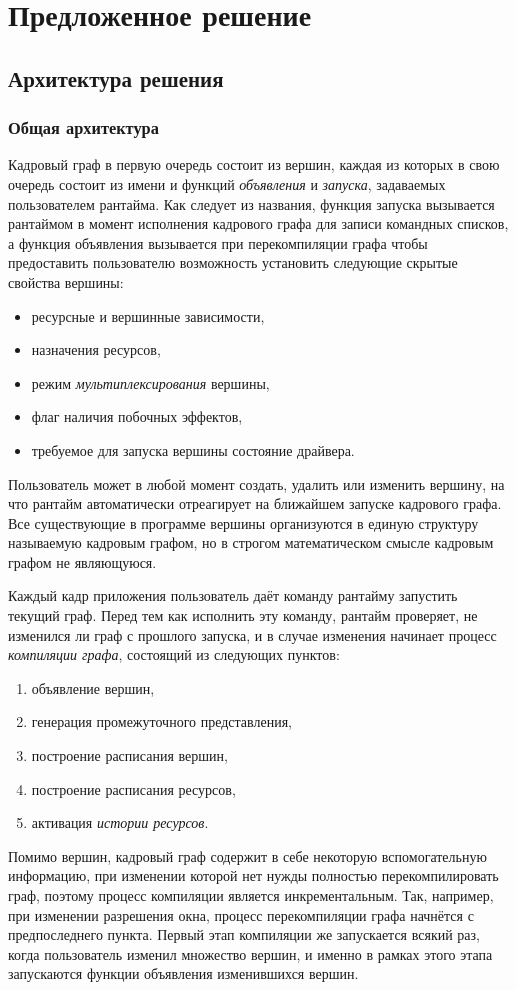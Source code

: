\section{Предложенное решение}
\subsection{Архитектура решения}
\subsubsection{Общая архитектура}
Кадровый граф в первую очередь состоит из вершин, каждая из которых в свою очередь состоит из имени и функций \textit{объявления} и \textit{запуска}, задаваемых пользователем рантайма.
Как следует из названия, функция запуска вызывается рантаймом в момент исполнения кадрового графа для записи командных списков, а функция объявления вызывается при перекомпиляции графа чтобы предоставить пользователю возможность установить следующие скрытые свойства вершины:
\begin{itemize}
    \item ресурсные и вершинные зависимости,
    \item назначения ресурсов,
    \item режим \textit{мультиплексирования} вершины,
    \item флаг наличия побочных эффектов,
    \item требуемое для запуска вершины состояние драйвера.
\end{itemize}
Пользователь может в любой момент создать, удалить или изменить вершину, на что рантайм автоматически отреагирует на ближайшем запуске кадрового графа.
Все существующие в программе вершины организуются в единую структуру называемую кадровым графом, но в строгом математическом смысле кадровым графом не являющуюся.

Каждый кадр приложения пользователь даёт команду рантайму запустить текущий граф.
Перед тем как исполнить эту команду, рантайм проверяет, не изменился ли граф с прошлого запуска, и в случае изменения начинает процесс \textit{компиляции графа}, состоящий из следующих пунктов:
\begin{enumerate}
    \item объявление вершин,
    \item генерация промежуточного представления,
    \item построение расписания вершин,
    \item построение расписания ресурсов,
    \item активация \textit{истории ресурсов}.
\end{enumerate}
Помимо вершин, кадровый граф содержит в себе некоторую вспомогательную информацию, при изменении которой нет нужды полностью перекомпилировать граф, поэтому процесс компиляции является инкрементальным.
Так, например, при изменении разрешения окна, процесс перекомпиляции графа начнётся с предпоследнего пункта.
Первый этап компиляции же запускается всякий раз, когда пользователь изменил множество вершин, и именно в рамках этого этапа запускаются функции объявления изменившихся вершин.

